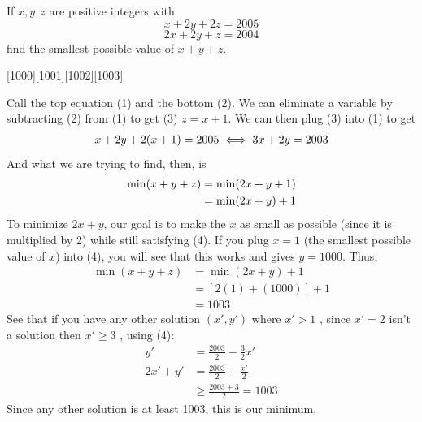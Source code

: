\documentclass[12pt]{article}
\newcounter{problem}
\begin{document}
\begin{problem}
   If $x,y,z$ are positive integers with 
    $$x + 2y + 2z = 2005$$ 
    $$2x + 2y + z = 2004$$ 
    find the smallest possible value of $x + y + z$.
\end{problem}
[1000][1001][1002][1003]
\begin{solution}[E]
   Call the top equation (1) and the bottom (2). We can eliminate a variable by subtracting (2) from (1) to get (3) $z = x+1$. We can then plug (3) into (1) to get
   \begin{align}\setcounter{equation}{3}
       x+2y+2(x+1)=2005 \iff 3x+2y = 2003
   \end{align}
   And what we are trying to find, then, is
   \begin{align*}
       \min(x+y+z) &= \min(2x+y+1)\notag\\
       &= \min(2x+y)+1
   \end{align*}
   To minimize $2x+y$, our goal is to make the $x$ as small as possible (since it is multiplied by 2) while still satisfying (4). If you plug $x=1$ (the smallest possible value of $x$) into (4), you will see that this works and gives $y=1000$. Thus,
   \begin{align*}
       \min(x+y+z) &= \min(2x+y)+1\\
       &=[2(1)+(1000)]+1 \\
       &=\boxed{1003}
   \end{align*}
   See that if you have any other solution $(x',y')$ where $x'>1$ , since $x'=2$ isn't a solution then $x' \geq 3$ , using (4):
   \begin{align*}
       y' &= \frac{2003}{2} - \frac{3}{2}x' \\
       2x'+ y' &= \frac{2003}{2} + \frac{x'}{2} \\
       &\geq \frac{2003+3}{2} = 1003
   \end{align*}
   Since any other solution is at least 1003, this is our minimum.
\end{solution}
\end{document}

